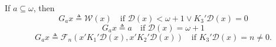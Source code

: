 If $a \subseteq \omega$, then
$$G_a x \triangleq \mathcal{W}(x) \quad \text{if } \mathcal{D}(x) < \omega + 1 \lor K_3' \mathcal{D}(x) = 0$$
$$G_a x \triangleq a \quad \text{if } \mathcal{D}(x) = \omega + 1$$
$$G_a x \triangleq \mathcal{F}_n(x' K_1' \mathcal{D}(x), x' K_2' \mathcal{D}(x)) \quad \text{if } K_3' \mathcal{D}(x) = n \neq 0.$$
